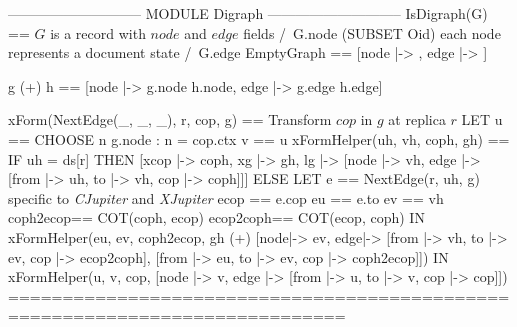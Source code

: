 \documentclass[preview, border={5pt 0pt 5pt 1pt}]{standalone}
\newcommand{\cjupiter}{\textsl{CJupiter}}
\newcommand{\xjupiter}{\textsl{XJupiter}}
\begin{document}
\begin{tla}
----------------------------- MODULE Digraph -----------------------------
IsDigraph(G) == \* $G$ is a record with $node$ and $edge$ fields
    /\ G.node \subseteq (SUBSET Oid) \* each node represents a document state
    /\ G.edge 
EmptyGraph == [node |-> {{}}, edge |-> {}]

g (+) h == [node |-> g.node \cup h.node, edge |-> g.edge \cup h.edge]

xForm(NextEdge(_, _, _), r, cop, g) == \* Transform $cop$ in $g$ at replica $r$
    LET u == CHOOSE n \in g.node : n = cop.ctx    v == u 
        xFormHelper(uh, vh, coph, gh) ==
            IF uh = ds[r] THEN [xcop |-> coph, xg |-> gh,
                 lg |-> [node |-> {vh},
               edge |-> {[from |-> uh, to |-> vh, cop |-> coph]}]] 
            ELSE LET e == NextEdge(r, uh, g) \* specific to \cjupiter{} and \xjupiter{}
                  ecop == e.cop    eu == e.to    ev == vh 
              coph2ecop== COT(coph, ecop)
              ecop2coph== COT(ecop, coph)
                    IN xFormHelper(eu, ev, coph2ecop,
                     gh (+) [node|-> {ev},
                             edge|-> {[from |-> vh, to |-> ev, cop |-> ecop2coph],
                                      [from |-> eu, to |-> ev, cop |-> coph2ecop]}])
    IN xFormHelper(u, v, cop, [node |-> {v},
                               edge |-> {[from |-> u, to |-> v, cop |-> cop]}])  
=============================================================================
\end{tla}
\end{document}

